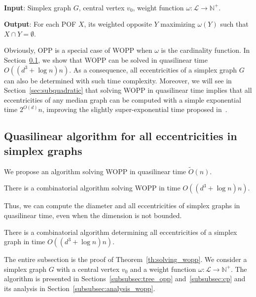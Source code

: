 \documentclass[a4paper,UKenglish,numberwithinsect,cleveref, autoref,anonymous]{lipics-v2021}
\begin{document}
\begin{definition}[WOPP]~

\textbf{Input}: Simplex graph $G$, central vertex $v_0$, weight function $\omega : \mathcal{L} \rightarrow \mathbb{N}^+$.

\textbf{Output}: For each POF $X$, its weighted opposite $Y$ maximizing $\omega(Y)$ such that $X \cap Y = \emptyset$.
\label{def:wdpp}
\end{definition}

Obviously, OPP is a special case of WOPP when $\omega$ is the cardinality function. In Section~\ref{subsec:partitioning}, we show that WOPP can be solved in quasilinear time $O((d^3+\log n)n)$. As a consequence, all eccentricities of a simplex graph $G$ can also be determined with such time complexity. Moreover, we will see in Section~\ref{sec:subquadratic} that solving WOPP in quasilinear time implies that all eccentricities of any median graph can be computed with a simple exponential time $2^{O(d)}n$, improving the slightly super-exponential time proposed in~\cite{BeHa21}.

\subsection{Quasilinear algorithm for all eccentricities in simplex graphs} \label{subsec:partitioning}

We propose an algorithm solving WOPP in quasilinear time $\tilde{O}(n)$. 

\begin{theorem}
There is a combinatorial algorithm solving WOPP in time $O((d^3+\log n)n)$. 
\label{th:solving_wopp}
\end{theorem}

Thus, we can compute the diameter and all eccentricities of simplex graphs in quasilinear time, even when the dimension is not bounded.

\begin{corollary}
There is a combinatorial algorithm determining all eccentricities of a simplex graph in time $O((d^3+\log n)n)$.
\label{co:linear_simplex}
\end{corollary}


The entire subsection is the proof of Theorem~\ref{th:solving_wopp}. We consider a simplex graph $G$ with a central vertex $v_0$ and a weight function $\omega : \mathcal{L} \rightarrow \mathbb{N}^+$. The algorithm is presented in Sections~\ref{subsubsec:tree_opp} and~\ref{subsubsec:cp} and its analysis in Section~\ref{subsubsec:analysis_wopp}.
\end{document}
